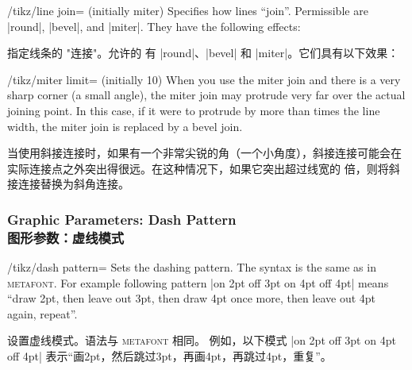 \begin{key}{/tikz/line join= (initially miter)}
    Specifies how lines ``join''. Permissible  are |round|, |bevel|,
    and |miter|. They have the following effects:
    
    指定线条的 "连接"。允许的  有 |round|、|bevel| 和 |miter|。它们具有以下效果：
%
\begin{codeexample}[]
\end{codeexample}

    \begin{key}{/tikz/miter limit= (initially 10)}
        When you use the miter join and there is a very sharp corner (a small
        angle), the miter join may protrude very far over the actual joining
        point. In this case, if it were to protrude by more than 
        times the line width, the miter join is replaced by a bevel join.
        
        当使用斜接连接时，如果有一个非常尖锐的角（一个小角度），斜接连接可能会在实际连接点之外突出得很远。在这种情况下，如果它突出超过线宽的  倍，则将斜接连接替换为斜角连接。
\begin{codeexample}[]
\end{codeexample}
    \end{key}
\end{key}


\subsubsection{Graphic Parameters: Dash Pattern\\图形参数：虚线模式}

\begin{key}{/tikz/dash pattern=}
    Sets the dashing pattern. The syntax is the same as in \textsc{metafont}.
    For example following pattern |on 2pt off 3pt on 4pt off 4pt| means ``draw
    2pt, then leave out 3pt, then draw 4pt once more, then leave out 4pt again,
    repeat''.
    
    设置虚线模式。语法与 \textsc{metafont} 相同。
例如，以下模式 |on 2pt off 3pt on 4pt off 4pt| 表示“画2pt，然后跳过3pt，再画4pt，再跳过4pt，重复”。
%
\begin{codeexample}[]
\begin{tikzpicture}[dash pattern=on 2pt off 3pt on 4pt off 4pt]
  \draw (0pt,0pt) -- (3.5cm,0pt);
\end{tikzpicture}
\end{codeexample}
\end{key}


